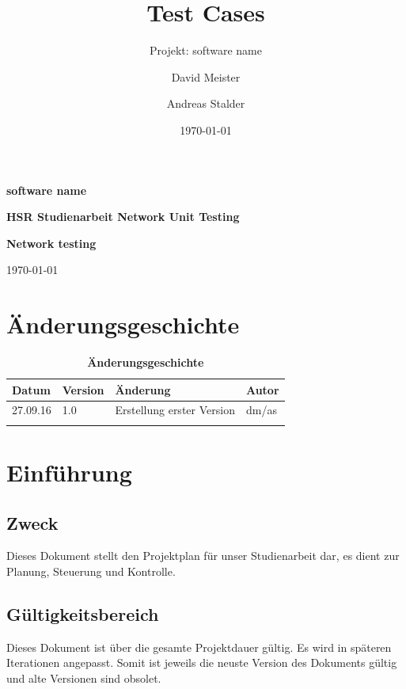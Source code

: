 \documentclass[a4,12pt]{scrartcl}
\title{Test Cases}
\subtitle{Projekt: software name}
\author{David Meister \and Andreas Stalder}
\date{\today}
\begin{document}
\begin{titlepage}
	\centering
	\vspace{5cm}
	\begin{center}
	\end{center}
	{\huge\bfseries software name\par}
	\vspace{8cm}
	\raggedright
	{\bfseries HSR Studienarbeit Network Unit Testing\par}
	{\huge\bfseries Network testing\par}
	\vspace{1cm}
	{\theauthor \par}
	{\today\par}

\end{titlepage}

\section{Änderungsgeschichte}

\begin{table}[htb]
\centering
    \begin{tabular}{@{} l l l l@{}}\toprule    
    {Datum} & {Version} & {Änderung} & {Autor}\\ \midrule
    27.09.16 & 1.0 & Erstellung erster Version & dm/as\\ \addlinespace
    \end{tabular}
\caption{\textbf{Änderungsgeschichte}}
\end{table}

\newpage

\tableofcontents
\newpage


\section{Einführung}
\subsection{Zweck}
Dieses Dokument stellt den Projektplan für unser Studienarbeit dar, es dient zur Planung, Steuerung und Kontrolle.
\subsection{Gültigkeitsbereich}
Dieses Dokument ist über die gesamte Projektdauer gültig. Es wird in späteren Iterationen angepasst. Somit ist jeweils die neuste Version des Dokuments gültig und alte Versionen sind obsolet.
\end{document}
